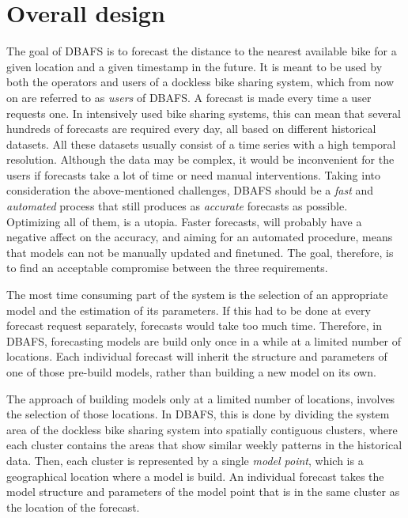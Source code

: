 \documentclass[12pt,oneside]{reedthesis}
\begin{document}
\section{Overall design}\label{overall-design}

The goal of DBAFS is to forecast the distance to the nearest available
bike for a given location and a given timestamp in the future. It is
meant to be used by both the operators and users of a dockless bike
sharing system, which from now on are referred to as \emph{users} of
DBAFS. A forecast is made every time a user requests one. In intensively
used bike sharing systems, this can mean that several hundreds of
forecasts are required every day, all based on different historical
datasets. All these datasets usually consist of a time series with a
high temporal resolution. Although the data may be complex, it would be
inconvenient for the users if forecasts take a lot of time or need
manual interventions. Taking into consideration the above-mentioned
challenges, DBAFS should be a \emph{fast} and \emph{automated} process
that still produces as \emph{accurate} forecasts as possible. Optimizing
all of them, is a utopia. Faster forecasts, will probably have a
negative affect on the accuracy, and aiming for an automated procedure,
means that models can not be manually updated and finetuned. The goal,
therefore, is to find an acceptable compromise between the three
requirements.

The most time consuming part of the system is the selection of an
appropriate model and the estimation of its parameters. If this had to
be done at every forecast request separately, forecasts would take too
much time. Therefore, in DBAFS, forecasting models are build only once
in a while at a limited number of locations. Each individual forecast
will inherit the structure and parameters of one of those pre-build
models, rather than building a new model on its own.

The approach of building models only at a limited number of locations,
involves the selection of those locations. In DBAFS, this is done by
dividing the system area of the dockless bike sharing system into
spatially contiguous clusters, where each cluster contains the areas
that show similar weekly patterns in the historical data. Then, each
cluster is represented by a single \emph{model point}, which is a
geographical location where a model is build. An individual forecast
takes the model structure and parameters of the model point that is in
the same cluster as the location of the forecast.
\end{document}
